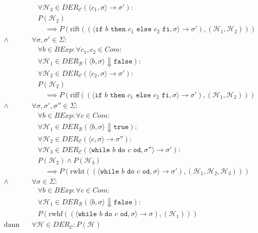 \documentclass[a4paper, 11pt, accentcolor = tud3b]{tudreport}
\begin{document}
\begin{align*}
							    &\quad \forall \mathcal{H} _ 2 \in \textit{DER} _ \mathcal{C} (\langle c _ 1, \sigma \rangle \rightarrow \sigma') : \\
							    &\quad P(\mathcal{H} _ 2) \\
							    &\quad\quad \implies P(\text{rift}((\langle \texttt{if } b \texttt{ then } c _ 1 \texttt{ else } c _ 2 \texttt{ fi}, \sigma \rangle \rightarrow \sigma'), (\mathcal{H} _ 1, \mathcal{H} _ 2))) \\
						    \land & \,\forall \sigma, \sigma' \in \Sigma : \\
							    &\quad \forall b \in \textit{BExp} : \forall c _ 1, c _ 2 \in \textit{Com} : \\
							    &\quad \forall \mathcal{H} _ 1 \in \textit{DER} _ \mathcal{B} (\langle b, \sigma \rangle \Downarrow \texttt{false}) : \\
							    &\quad \forall \mathcal{H} _ 2 \in \textit{DER} _ \mathcal{C} (\langle c _ 2, \sigma \rangle \rightarrow \sigma') : \\
							    &\quad P(\mathcal{H} _ 2) \\
							    &\quad\quad \implies P(\text{riff}((\langle \texttt{if } b \texttt{ then } c _ 1 \texttt{ else } c _ 2 \texttt{ fi}, \sigma \rangle \rightarrow \sigma'), (\mathcal{H} _ 1, \mathcal{H} _ 2))) \\
						    \land & \,\forall \sigma, \sigma', \sigma'' \in \Sigma : \\
							    &\quad \forall b \in \textit{BExp} : \forall c \in \textit{Com} : \\
							    &\quad \forall \mathcal{H} _ 1 \in \textit{DER} _ \mathcal{B} (\langle b, \sigma \rangle \Downarrow \texttt{true}) : \\
							    &\quad \forall \mathcal{H} _ 2 \in \textit{DER} _ \mathcal{C} (\langle c, \sigma \rangle \rightarrow \sigma'') : \\
							    &\quad \forall \mathcal{H} _ 3 \in \textit{DER} _ \mathcal{C} (\langle \texttt{while } b \texttt{ do } c \texttt{ od}, \sigma'' \rangle \rightarrow \sigma') : \\
							    &\quad P(\mathcal{H} _ 2) \land P(\mathcal{H} _ 3) \\
							    &\quad\quad \implies P(\text{rwht}((\langle \texttt{while } b \texttt{ do } c \texttt{ od}, \sigma \rangle \rightarrow \sigma'), (\mathcal{H} _ 1, \mathcal{H} _ 2, \mathcal{H} _ 3))) \\
						    \land & \,\forall \sigma \in \Sigma : \\
							    &\quad \forall b \in \textit{BExp} : \forall c \in \textit{Com} : \\
							    &\quad \forall \mathcal{H} _ 1 \in \textit{DER} _ \mathcal{B} (\langle b, \sigma \rangle \Downarrow \texttt{false}) : \\
							    &\quad P(\text{rwhf}((\langle \texttt{while } b \texttt{ do } c \texttt{ od}, \sigma \rangle \rightarrow \sigma), (\mathcal{H} _ 1))) \\
						    \text{dann gilt:} & \,\forall \mathcal{H} \in \textit{DER} _ \mathcal{C} : P(\mathcal{H}) \\
					    \end{align*}
				    
\end{document}

